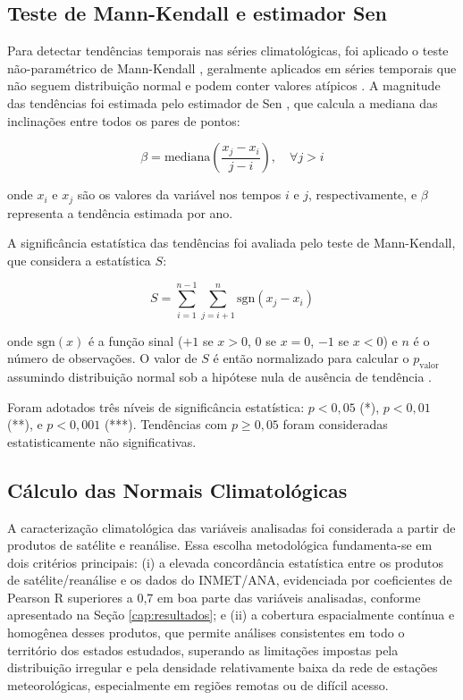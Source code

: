 \subsection{Teste de Mann-Kendall e estimador Sen}

Para detectar tendências temporais nas séries climatológicas, foi aplicado
o teste não-paramétrico de Mann-Kendall \citep{Mann1945, Kendall1975}, geralmente aplicados em séries temporais que não seguem 
distribuição normal e podem conter valores atípicos \citep{yue2002, wilks2011}. 
A magnitude das tendências foi estimada pelo estimador de Sen \citep{Sen1968}, 
que calcula a mediana das inclinações entre todos os pares de pontos:

\begin{equation}
	\beta = \text{mediana}\left(\frac{x_j - x_i}{j - i}\right), \quad \forall j > i
	\label{eq:sen_slope}
\end{equation}

\noindent onde $x_i$ e $x_j$ são os valores da variável nos tempos $i$ e $j$, 
respectivamente, e $\beta$ representa a tendência estimada por ano.

A significância estatística das tendências foi avaliada pelo teste de Mann-Kendall, 
que considera a estatística $S$:

\begin{equation}
	S = \sum_{i=1}^{n-1} \sum_{j=i+1}^{n} \text{sgn}(x_j - x_i)
	\label{eq:mann_kendall_s}
\end{equation}

\noindent onde $\text{sgn}(x)$ é a função sinal ($+1$ se $x>0$, $0$ se $x=0$, 
$-1$ se $x<0$) e $n$ é o número de observações. O valor de $S$ é então 
normalizado para calcular o $p_\text{valor}$ assumindo distribuição normal sob a 
hipótese nula de ausência de tendência \citep{Kendall1975}.

Foram adotados três níveis de significância estatística: $p < 0{,}05$ (*), 
$p < 0{,}01$ (**), e $p < 0{,}001$ (***). Tendências com $p \geq 0{,}05$ 
foram consideradas estatisticamente não significativas.

\subsection{Cálculo das Normais Climatológicas}
\label{sub:normais_climatologicas}

A caracterização climatológica das variáveis analisadas foi considerada a partir de produtos 
de satélite e reanálise. Essa escolha metodológica fundamenta-se em dois critérios principais: 
(i) a elevada concordância estatística entre os produtos de satélite/reanálise e os dados 
do INMET/ANA, evidenciada por coeficientes de Pearson R superiores a 0{,}7 em boa parte das variáveis analisadas, conforme apresentado na Seção \ref{cap:resultados}; e (ii) a 
cobertura espacialmente contínua e homogênea desses produtos, que permite análises 
consistentes em todo o território dos estados estudados, superando as limitações impostas 
pela distribuição irregular e pela densidade relativamente baixa da rede de estações 
meteorológicas, especialmente em regiões remotas ou de difícil acesso.

